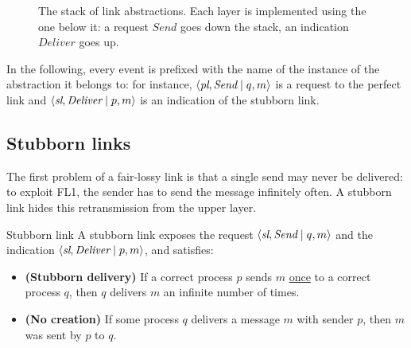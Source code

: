 \begin{figure}[H]
  \centering
  \caption{The stack of link abstractions. Each layer is implemented using the one below it: a request $\textit{Send}$ goes down the stack, an indication $\textit{Deliver}$ goes up.}
  \label{fig:link-stack}
\end{figure}

In the following, every event is prefixed with the name of the instance of the abstraction it belongs to: for instance, $\left\langle \textit{pl}, \textit{Send} \mid q, m \right\rangle$ is a request to the perfect link and $\left\langle \textit{sl}, \textit{Deliver} \mid p, m \right\rangle$ is an indication of the stubborn link.

\subsection{Stubborn links}

The first problem of a fair-lossy link is that a single send may never be delivered: to exploit FL1, the sender has to send the message infinitely often. A stubborn link hides this retransmission from the upper layer.

\begin{frameddefn}{Stubborn link}
  A stubborn link exposes the request $\left\langle \textit{sl}, \textit{Send} \mid q, m \right\rangle$ and the indication $\left\langle \textit{sl}, \textit{Deliver} \mid p, m \right\rangle$, and satisfies:
  \begin{itemize}[leftmargin=3.4em]
    \item[\textbf{SL1}] \textbf{(Stubborn delivery)} If a correct process $p$ sends $m$ \underline{once} to a correct process $q$, then $q$ delivers $m$ an infinite number of times.
    \item[\textbf{SL2}] \textbf{(No creation)} If some process $q$ delivers a message $m$ with sender $p$, then $m$ was sent by $p$ to $q$.
  \end{itemize}
\end{frameddefn}

